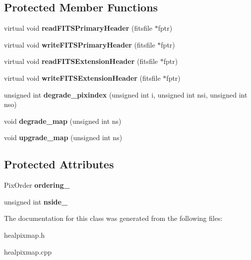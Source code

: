 \subsection*{Protected Member Functions}
\begin{DoxyCompactItemize}
\item 
\hypertarget{classHealpixMap_aaa5d48e02428e6bf8c19b66443cf7551}{
virtual void {\bfseries readFITSPrimaryHeader} (fitsfile $\ast$fptr)}
\label{classHealpixMap_aaa5d48e02428e6bf8c19b66443cf7551}

\item 
\hypertarget{classHealpixMap_a8f6f6700ffd64451f24ddb79eb3100c7}{
virtual void {\bfseries writeFITSPrimaryHeader} (fitsfile $\ast$fptr)}
\label{classHealpixMap_a8f6f6700ffd64451f24ddb79eb3100c7}

\item 
\hypertarget{classHealpixMap_a1de90338e2b7f8e708703c7842ad9859}{
virtual void {\bfseries readFITSExtensionHeader} (fitsfile $\ast$fptr)}
\label{classHealpixMap_a1de90338e2b7f8e708703c7842ad9859}

\item 
\hypertarget{classHealpixMap_a22807323fccde4ac8795c37b3b05aedc}{
virtual void {\bfseries writeFITSExtensionHeader} (fitsfile $\ast$fptr)}
\label{classHealpixMap_a22807323fccde4ac8795c37b3b05aedc}

\item 
\hypertarget{classHealpixMap_af5e00392cd0a00f6430fcd3a512a9d6a}{
unsigned int {\bfseries degrade\_\-pixindex} (unsigned int i, unsigned int nsi, unsigned int nso)}
\label{classHealpixMap_af5e00392cd0a00f6430fcd3a512a9d6a}

\item 
\hypertarget{classHealpixMap_a98bf124c25890d74ad4b5bd57732d9ce}{
void {\bfseries degrade\_\-map} (unsigned int ns)}
\label{classHealpixMap_a98bf124c25890d74ad4b5bd57732d9ce}

\item 
\hypertarget{classHealpixMap_abe1eb636e3060261442456f9c30cd741}{
void {\bfseries upgrade\_\-map} (unsigned int ns)}
\label{classHealpixMap_abe1eb636e3060261442456f9c30cd741}

\end{DoxyCompactItemize}
\subsection*{Protected Attributes}
\begin{DoxyCompactItemize}
\item 
\hypertarget{classHealpixMap_a3850f4fc8beb20eb7a9dcfb582950f3b}{
PixOrder {\bfseries ordering\_\-}}
\label{classHealpixMap_a3850f4fc8beb20eb7a9dcfb582950f3b}

\item 
\hypertarget{classHealpixMap_a59ae2cba27ba837beaa7efa22270403f}{
unsigned int {\bfseries nside\_\-}}
\label{classHealpixMap_a59ae2cba27ba837beaa7efa22270403f}

\end{DoxyCompactItemize}


The documentation for this class was generated from the following files:\begin{DoxyCompactItemize}
\item 
healpixmap.h\item 
healpixmap.cpp\end{DoxyCompactItemize}
